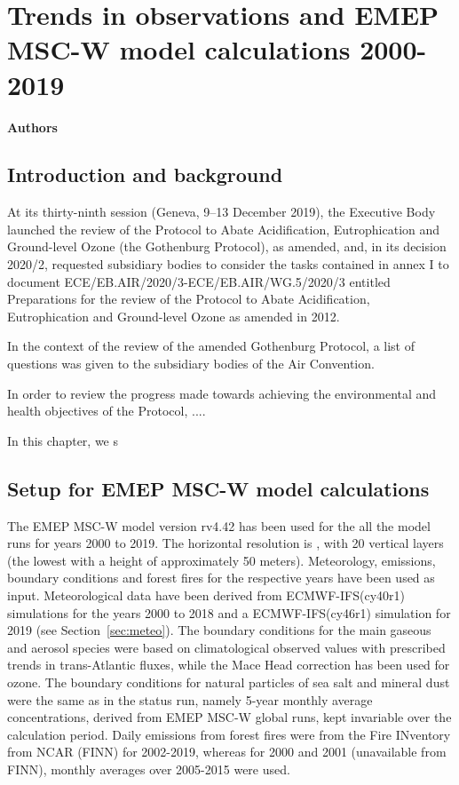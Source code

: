 \chapter[Trends]{Trends in observations and EMEP MSC-W model calculations 2000-2019}
\label{ch:Trends}

{\bf{Authors}}\\


\section{\label{sec:Trends_introduction}Introduction and background}
At its thirty-ninth session (Geneva, 9–13 December 2019), the Executive Body launched the review of the Protocol to Abate Acidification, Eutrophication and Ground-level Ozone (the Gothenburg Protocol), as amended, and, in its decision 2020/2, requested subsidiary bodies to consider the tasks contained in annex I to document ECE/EB.AIR/2020/3-ECE/EB.AIR/WG.5/2020/3 entitled Preparations for the review of the Protocol to Abate Acidification, Eutrophication and Ground-level Ozone as amended in 2012.

In the context of the review of the amended Gothenburg Protocol, a list of questions was given to the subsidiary bodies of the Air Convention.

In order to review the progress made towards achieving the environmental and health objectives of the Protocol, ....

In this chapter, we s


\section{\label{EMEPmodelcalc}{Setup for EMEP MSC-W model calculations}}
The EMEP MSC-W model version rv4.42 has been used for the all the model runs for years 2000 to 2019. The horizontal resolution is \resZO, with 20 vertical layers (the lowest with a height of approximately 50 meters).
 Meteorology, emissions, boundary conditions and forest fires for the respective years have been used as input. Meteorological data have been
 derived from ECMWF-IFS(cy40r1) simulations for the years 2000 to 2018 and a ECMWF-IFS(cy46r1) simulation for 2019 (see Section~\ref{sec:meteo}). 
 The boundary conditions for the main gaseous and aerosol species were based on climatological observed values with prescribed trends in trans-Atlantic fluxes, while the Mace
Head correction has been used for ozone. The boundary conditions for natural particles of
sea salt and mineral dust were the same as in the status run, namely 5-year monthly average
concentrations, derived from EMEP MSC-W global runs, kept invariable over the calculation
period.
Daily emissions from forest fires were from the Fire INventory from NCAR (FINN) for 2002-2019,
whereas for 2000 and 2001 (unavailable from FINN), monthly averages over 2005-2015 were
used.

